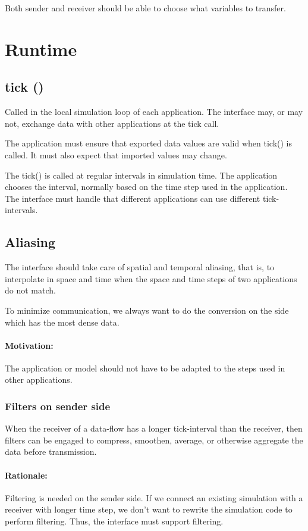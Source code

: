 \documentclass[a4paper]{report}
\newenvironment{rationale}%
{\par\paragraph{Rationale:}}%
{\par}
\begin{document}
Both sender and receiver should be able to choose what variables to
transfer.


\section{Runtime}

\subsection{tick ()}

Called in the local simulation loop of each application.
The interface may, or may not, exchange data with other applications
at the tick call.

The application must ensure that exported data values are valid when
tick() is called.  It must also expect that imported values may change.

The tick() is called at regular intervals in simulation time.
The application chooses the interval, normally based on the time step
used in the application.  The interface must handle that different
applications can use different tick-intervals.


\subsection{Aliasing}

The interface should take care of spatial and temporal aliasing, that
is, to interpolate in space and time when the space and time steps of
two applications do not match.

To minimize communication, we always want to do the conversion on the
side which has the most dense data.

\paragraph{Motivation:} The application or model should not have to be
adapted to the steps used in other applications.


\subsubsection{Filters on sender side}

When the receiver of a data-flow has a longer tick-interval than the
receiver, then filters can be engaged to compress, smoothen, average,
or otherwise aggregate the data before transmission.

\begin{rationale}
  Filtering is needed on the sender side.  If we connect an existing
  simulation with a receiver with longer time step, we don't want to
  rewrite the simulation code to perform filtering.  Thus, the
  interface must support filtering.
\end{rationale}
\end{document}
